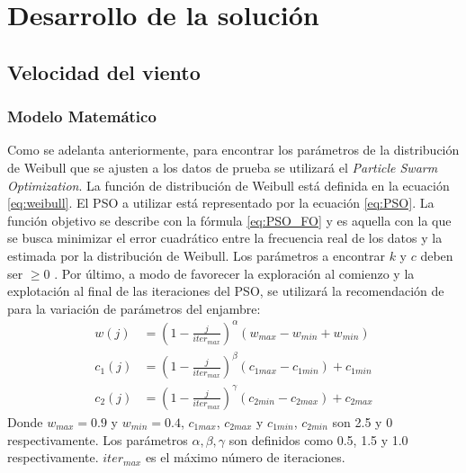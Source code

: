 
\chapter{Desarrollo de la solución}

\section{Velocidad del viento}
\subsection{Modelo Matemático} \label{ss:Modelo_Mat}
Como se adelanta anteriormente, para encontrar los parámetros de la distribución de Weibull que se ajusten a los datos de prueba se utilizará el \emph{Particle Swarm Optimization}. La función de distribución de Weibull está definida en la ecuación \ref{eq:weibull}. El PSO a utilizar está representado por la ecuación \ref{eq:PSO}. La función objetivo se describe con la fórmula \ref{eq:PSO_FO} y es aquella con la que se busca minimizar el error cuadrático entre la frecuencia real de los datos y la estimada por la distribución de Weibull. Los parámetros a encontrar $k$ y $c$ deben ser $\geq 0$ . Por último, a modo de favorecer la exploración al comienzo y la explotación al final de las iteraciones del PSO, se utilizará la recomendación de \cite{Carneiro15} para la variación de parámetros del enjambre:
\begin{align}\label{eq:VariationParameters}
    w(j) &= (1 - \frac{j}{iter_{max}})^{\alpha}(w_{max} - w_{min} + w_{min})\\
    c_{1}(j) &= (1 - \frac{j}{iter_{max}})^{\beta}(c_{1max} - c_{1min}) + c_{1min}\\
    c_{2}(j) &= (1 - \frac{j}{iter_{max}})^{\gamma}(c_{2min} - c_{2max}) + c_{2max}
\end{align}    
Donde $w_{max} = 0.9$ y $w_{min} = 0.4$, $c_{1max}$, $c_{2max}$ y $c_{1min}$, $c_{2min}$ son 2.5 y 0 respectivamente. Los parámetros $\alpha, \beta, \gamma$ son definidos como 0.5, 1.5 y 1.0 respectivamente. $iter_{max}$ es el máximo número de iteraciones.

